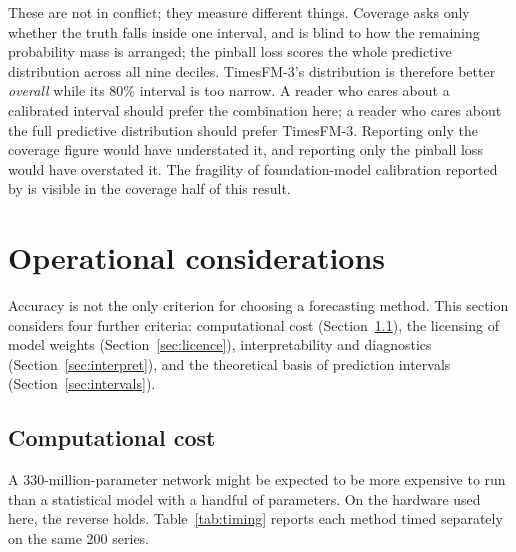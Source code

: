 \documentclass[article]{ajs}
\providecommand{\sectionref}[1]{Section~\ref{#1}}
\providecommand{\tableref}[1]{Table~\ref{#1}}
\begin{document}
These are not in conflict; they measure different things. Coverage asks only whether the truth
falls inside one interval, and is blind to how the remaining probability mass is arranged; the
pinball loss scores the whole predictive distribution across all nine deciles. TimesFM-3's
distribution is therefore better \emph{overall} while its 80\% interval is too narrow. A reader
who cares about a calibrated interval should prefer the combination here; a reader who cares
about the full predictive distribution should prefer TimesFM-3. Reporting only the coverage
figure would have understated it, and reporting only the pinball loss would have overstated it.
The fragility of foundation-model calibration reported by \citet{adler2026calibrated} is visible
in the coverage half of this result.

\section{Operational considerations}
\label{sec:operational}

Accuracy is not the only criterion for choosing a forecasting method. This section considers four
further criteria: computational cost (\sectionref{sec:cost}), the licensing of model weights
(\sectionref{sec:licence}), interpretability and diagnostics (\sectionref{sec:interpret}), and
the theoretical basis of prediction intervals (\sectionref{sec:intervals}).

\subsection{Computational cost}
\label{sec:cost}

A 330-million-parameter network might be expected to be more expensive to run than a
statistical model with a handful of parameters. On the hardware used here, the reverse holds.
\tableref{tab:timing} reports each method timed separately on the same 200 series.
\end{document}

